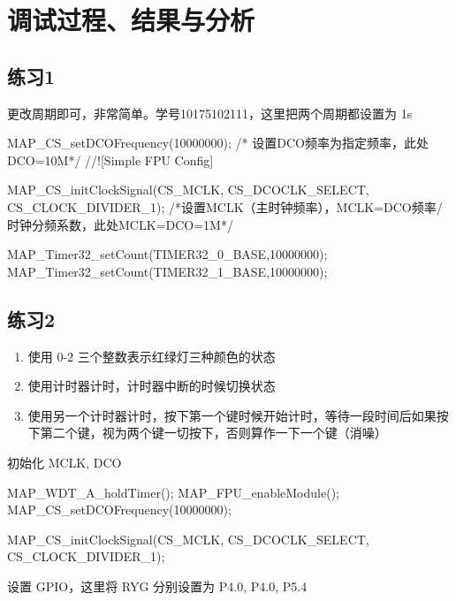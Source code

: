 \documentclass[a4paper,10pt,UTF8]{paper}
\numberwithin{equation}{section}
\numberwithin{figure}{section}
\begin{document}
\section{调试过程、结果与分析}

\subsection{练习1}


更改周期即可，非常简单。学号10175102111，这里把两个周期都设置为 1s

\begin{ccode}
    MAP_CS_setDCOFrequency(10000000); /* 设置DCO频率为指定频率，此处DCO=10M*/
    //![Simple FPU Config]
    
    MAP_CS_initClockSignal(CS_MCLK, CS_DCOCLK_SELECT, CS_CLOCK_DIVIDER_1); 
    /*设置MCLK（主时钟频率），MCLK=DCO频率/时钟分频系数，此处MCLK=DCO=1M*/

    MAP_Timer32_setCount(TIMER32_0_BASE,10000000);
    MAP_Timer32_setCount(TIMER32_1_BASE,10000000);
\end{ccode}

\subsection{练习2}

\begin{enumerate}
    \item 使用 0-2 三个整数表示红绿灯三种颜色的状态
    \item 使用计时器计时，计时器中断的时候切换状态
    \item 使用另一个计时器计时，按下第一个键时候开始计时，等待一段时间后如果按下第二个键，视为两个键一切按下，否则算作一下一个键（消噪）
\end{enumerate}

初始化 MCLK, DCO

\begin{ccode}
    MAP_WDT_A_holdTimer();
    MAP_FPU_enableModule();
    MAP_CS_setDCOFrequency(10000000);

    MAP_CS_initClockSignal(CS_MCLK, CS_DCOCLK_SELECT, CS_CLOCK_DIVIDER_1);
\end{ccode}

设置 GPIO，这里将 RYG 分别设置为 P4.0, P4.0, P5.4
\end{document}

